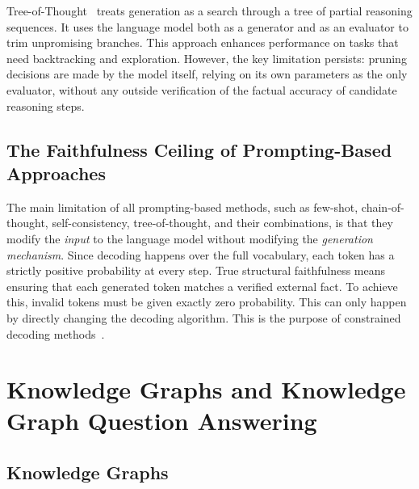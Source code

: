 Tree-of-Thought~\citep{yao2023tree} treats generation as a search through a tree of partial reasoning sequences. It uses the language model both as a generator and as an evaluator to trim unpromising branches. This approach enhances performance on tasks that need backtracking and exploration. However, the key limitation persists: pruning decisions are made by the model itself, relying on its own parameters as the only evaluator, without any outside verification of the factual accuracy of candidate reasoning steps.

\subsection{The Faithfulness Ceiling of Prompting-Based Approaches}

The main limitation of all prompting-based methods, such as few-shot, chain-of-thought, self-consistency, tree-of-thought, and their combinations, is that they modify the \textit{input} to the language model without modifying the \textit{generation mechanism}. Since decoding happens over the full vocabulary, each token has a strictly positive probability at every step. True structural faithfulness means ensuring that each generated token matches a verified external fact. To achieve this, invalid tokens must be given exactly zero probability. This can only happen by directly changing the decoding algorithm. This is the purpose of constrained decoding methods~\citep{geng2023grammarconstrained, willard2023outlines}.

\section{Knowledge Graphs and Knowledge Graph Question Answering}
\label{sec:kgqa}

\subsection{Knowledge Graphs}

